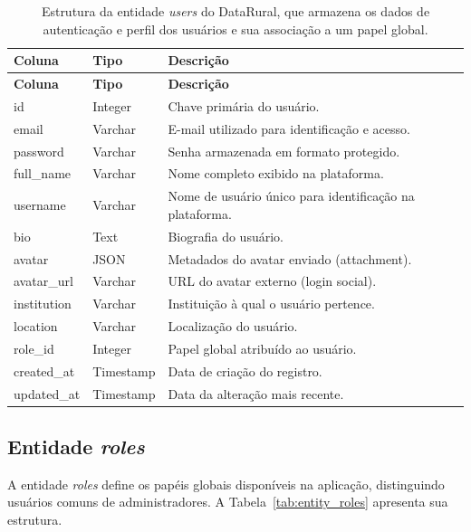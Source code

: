 \begin{longtable}{p{}p{}p{}}
\caption{Estrutura da entidade \textit{users} do DataRural, que armazena os dados de autenticação e perfil dos usuários e sua associação a um papel global.}\label{tab:entity_users}\\
\toprule
\textbf{Coluna} & \textbf{Tipo} & \textbf{Descrição} \\
\midrule
\endfirsthead
\toprule
\textbf{Coluna} & \textbf{Tipo} & \textbf{Descrição} \\
\midrule
\endhead
id & Integer & Chave primária do usuário. \\
email & Varchar & E-mail utilizado para identificação e acesso. \\
password & Varchar & Senha armazenada em formato protegido. \\
full\_name & Varchar & Nome completo exibido na plataforma. \\
username & Varchar & Nome de usuário único para identificação na plataforma. \\
bio & Text & Biografia do usuário. \\
avatar & JSON & Metadados do avatar enviado (attachment). \\
avatar\_url & Varchar & URL do avatar externo (login social). \\
institution & Varchar & Instituição à qual o usuário pertence. \\
location & Varchar & Localização do usuário. \\
role\_id & Integer & Papel global atribuído ao usuário. \\
created\_at & Timestamp & Data de criação do registro. \\
updated\_at & Timestamp & Data da alteração mais recente. \\
\bottomrule
\end{longtable}

\subsection{Entidade \textit{roles}}

A entidade \textit{roles} define os papéis globais disponíveis na aplicação, distinguindo usuários comuns de administradores. A Tabela~\ref{tab:entity_roles} apresenta sua estrutura.

